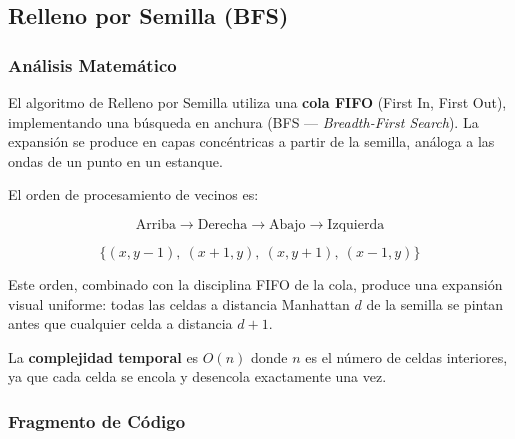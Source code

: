 \documentclass[
  spanish,
  a4paper,
  12pt,
]{article}
\begin{document}
\subsection{Relleno por Semilla
(BFS)}\label{relleno-por-semilla-bfs}

\subsubsection{Análisis
Matemático}\label{anuxe1lisis-matemuxe1tico-6}

El algoritmo de Relleno por Semilla utiliza una \textbf{cola FIFO}
(First In, First Out), implementando una búsqueda en anchura (BFS ---
\emph{Breadth-First Search}). La expansión se produce en capas
concéntricas a partir de la semilla, análoga a las ondas de un punto en
un estanque.

El orden de procesamiento de vecinos es:

\[\text{Arriba} \to \text{Derecha} \to \text{Abajo} \to \text{Izquierda}\]

\[\{(x, y-1),\ (x+1, y),\ (x, y+1),\ (x-1, y)\}\]

Este orden, combinado con la disciplina FIFO de la cola, produce una
expansión visual uniforme: todas las celdas a distancia Manhattan \(d\)
de la semilla se pintan antes que cualquier celda a distancia \(d+1\).

La \textbf{complejidad temporal} es \(O(n)\) donde \(n\) es el número de
celdas interiores, ya que cada celda se encola y desencola exactamente
una vez.

\newpage

\subsubsection{Fragmento de Código}\label{fragmento-de-cuxf3digo-6}
\end{document}
